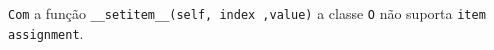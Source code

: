 \documentclass[12pt,varwidth=16cm,border=1pt]{standalone}
\begin{document}
\verb+Com+ a função \verb+__setitem__(self, index ,value)+ a classe \verb+O+ não suporta \verb+item assignment+.

\questiomfalse
\end{document}
